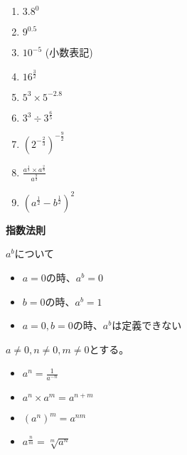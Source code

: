 \documentclass[12pt,b5paper]{ltjsarticle}
\begin{document}
\hrulefill
\begin{multicols}{2}
 \begin{enumerate}
  \item $3.8^0$
  \item $9^{0.5}$
  \item $10^{-5}$ (小数表記)
  \item $16^{\frac{3}{2}}$
  \item $5^3 \times 5^{-2.8}$
  \item $3^3 \div 3^{\frac{6}{5}}$
  \item $\left(2^{-\frac{2}{3}}\right)^{-\frac{9}{2}}$
  \item $\displaystyle \frac{a^{\frac{1}{3}}\times a^{\frac{2}{3}}}{a^{\frac{9}{4}}}$
  \item $\left( a^{\frac{1}{2}} - b^{\frac{1}{2}} \right)^2$
 \end{enumerate}
\end{multicols}

\dotfill

\textbf{指数法則}
\begin{multicols}{2}
$a^b$について
\begin{itemize}
 \item $a=0$の時、$a^b = 0$
 \item $b=0$の時、$a^b = 1$
 \item $a=0, b=0$の時、$a^b$は定義できない
\end{itemize}

$a\ne 0, n\ne 0, m\ne 0$とする。
\begin{itemize}
 \item $a^n=\frac{1}{a^{-n}}$
 \item $a^n \times a^m = a^{n+m}$
 \item $(a^n)^m = a^{nm}$
 \item $a^{\frac{n}{m}} = \sqrt[m]{a^n}$
\end{itemize}
\end{multicols}

\dotfill
\end{document}
